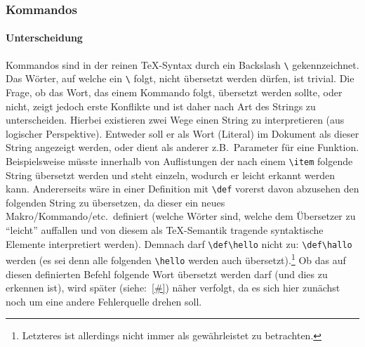 \subsubsection{Kommandos}
\paragraph{Unterscheidung}
Kommandos sind in der reinen \TeX{}-Syntax durch ein Backslash \verb|\| gekennzeichnet. Das Wörter, auf welche ein \verb|\| folgt, nicht übersetzt werden dürfen, ist trivial. 
Die Frage, ob das Wort, das einem Kommando folgt, übersetzt werden sollte, oder nicht, zeigt jedoch erste Konflikte und ist daher nach Art des Strings zu unterscheiden. %
Hierbei existieren zwei Wege einen String zu interpretieren (aus logischer Perspektive). Entweder soll er als Wort (Literal) im Dokument als dieser String angezeigt werden, oder dient als anderer z.B.\ Parameter für eine Funktion.%
Beispielsweise müsste innerhalb von Auflistungen der nach einem \verb|\item| folgende String übersetzt werden und steht einzeln, wodurch er leicht erkannt werden kann. Andererseits wäre in einer Definition mit \verb|\def| vorerst davon abzusehen den folgenden String zu übersetzen, da dieser ein neues Makro/Kommando/etc.\ definiert (welche Wörter sind, welche dem Übersetzer zu \enquote{leicht} auffallen und von diesem als \TeX{}-Semantik tragende syntaktische Elemente interpretiert werden). 
Demnach darf \verb|\def\hello| nicht zu: \verb|\def\hallo| werden (es sei denn alle folgenden \verb|\hello| werden auch übersetzt).\footnote{Letzteres ist allerdings nicht immer als gewährleistet zu betrachten.}%
Ob das auf diesen definierten Befehl folgende Wort übersetzt werden darf (und dies zu erkennen ist), wird später (siehe:~\ref{#}) näher verfolgt, da es sich hier zunächst noch um eine andere Fehlerquelle drehen soll. 

